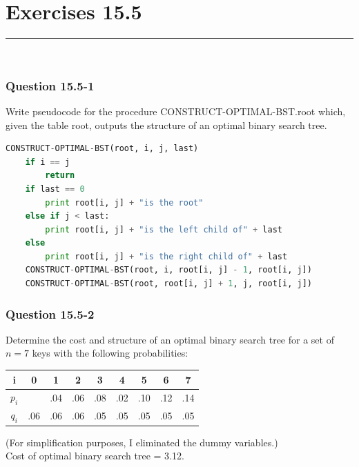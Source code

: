 \documentclass[11pt]{article}
\begin{document}
\section*{Exercises 15.5}\nointerlineskip
\noindent \rule{\linewidth}{0.01pt}\\

\subsubsection*{Question 15.5-1}\nointerlineskip
Write pseudocode for the procedure CONSTRUCT-OPTIMAL-BST.root which,
given the table root, outputs the structure of an optimal binary search tree.\\

\begin{minipage}{6in}
\begin{lstlisting}[language=Python]
CONSTRUCT-OPTIMAL-BST(root, i, j, last)
    if i == j
        return
    if last == 0
        print root[i, j] + "is the root"
    else if j < last:
        print root[i, j] + "is the left child of" + last
    else
        print root[i, j] + "is the right child of" + last
    CONSTRUCT-OPTIMAL-BST(root, i, root[i, j] - 1, root[i, j])
    CONSTRUCT-OPTIMAL-BST(root, root[i, j] + 1, j, root[i, j])
\end{lstlisting}
\end{minipage}

\subsubsection*{Question 15.5-2}\nointerlineskip
Determine the cost and structure of an optimal binary search tree for a set of $n=7$
keys with the following probabilities:\\
\begin{center}
\begin{tabular}{c | c c c c c c c c}
i & 0 & 1 & 2 & 3 & 4 & 5 & 6 & 7 \\ 
\hline
$p_i$ &  & .04 & .06 & .08 & .02 & .10 & .12 & .14 \\
$q_i$ & .06 & .06 & .06 & .05 & .05 & .05 & .05 & .05 \\   
\end{tabular}
\end{center}

\begin{center}
\end{center}
(For simplification purposes, I eliminated the dummy variables.)\\
Cost of optimal binary search tree = 3.12.\\
\end{document}
